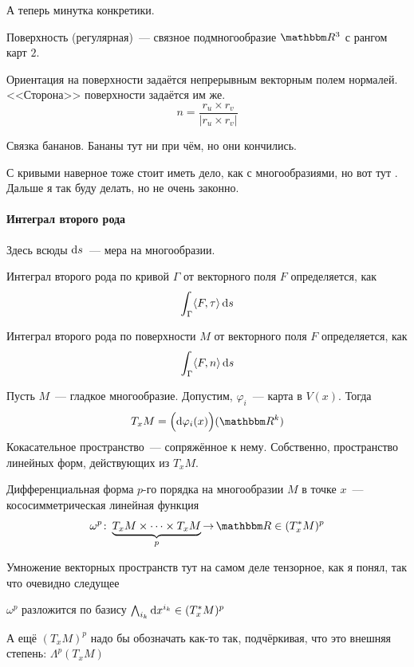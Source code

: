 \documentclass[draft,timbord]{longnotes}
\begin{document}
А теперь минутка конкретики. 
\begin{defn}\label{defn:dg::orient::surf}
  Поверхность (регулярная)~--- связное \quest подмногообразие $\R^3$ с рангом карт $2$.
\end{defn}

\begin{prop}\label{prop:dg::orient::surfnorm}
  Ориентация на поверхности задаётся непрерывным векторным полем нормалей.
  <<Сторона>> поверхности задаётся им же.
  \[
    n= \frac{r_u \times r_v }{|r_u \times r_v|} 
  \]
\end{prop}
\begin{lproof}
  Связка бананов. Бананы тут ни при чём, но они кончились.
\end{lproof}

\begin{rem}\label{rem:dg::orient::curvesfolds}
  С кривыми наверное тоже стоит иметь дело, как с многообразиями, но вот тут \quest.
  Дальше я так буду делать, но не очень законно.
\end{rem}

\paragraph{Интеграл второго рода}
\label{par:dg::secint}

Здесь всюды $\mathrm{d} s$~--- мера на многообразии.
\begin{defn}\label{defn:dg::secint::curv}
  Интеграл второго рода по кривой $\Gamma$  от векторного поля $F$ определяется, как 
  \[
  \int_\Gamma  \langle F ,\tau \rangle \, \mathrm{d} s
  \]
\end{defn}

\begin{defn}\label{defn:dg::secint::surf}
  Интеграл второго рода по поверхности $M$  от векторного поля $F$ определяется, как 
  \[
  \int_\Gamma  \langle F ,n \rangle \, \mathrm{d} s
  \]
\end{defn}

\begin{defn}\label{defn:dg::AAAA::tangentbndl}
  Пусть $M$~--- гладкое многообразие. Допустим, $\varphi_i$~--- карта в $V(x)$.
  Тогда
  \[
    T_x M = \Bigl(\del \varphi_i (x)\Bigr)(\R^k)
  \]
  Кокасательное пространство~--- сопряжённое к нему. Собственно, пространство линейных форм,
  действующих из $T_xM$.
\end{defn}

\begin{defn}\label{defn:dg::secint::difform}
  Дифференциальная форма $p$-го порядка на многообразии $M$ в точке $x$~--- 
  кососимметрическая линейная функция 
  \[
    \omega^p \colon \underbrace{T_x M \times \dotsm \times T_x M}_p  \to \R \in (T^*_x M)^p
  \]
\end{defn}
Умножение векторных пространств тут на самом деле тензорное, как я понял, так что
очевидно следущее
\begin{stat}\label{stat:dg::secint::difformbasis}
  $\omega^p$ разложится по базису $\bigwedge_{i_k} \mathrm{d} x^{i_k} \in (T^*_x M)^p$
\end{stat}
А ещё $(T_xM)^p$ надо бы обозначать как-то так, подчёркивая, что это внешняя степень: 
$\Lambda^p (T_xM)$
\end{document}
